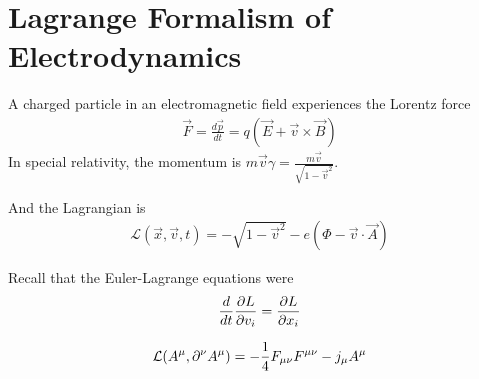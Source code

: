 \section{Lagrange Formalism of Electrodynamics}
A charged particle in an electromagnetic field experiences the Lorentz force
\begin{align*}
  \vec{F} = \frac{d \vec{p}}{d t} = q(\vec{E} + \vec{v} \times \vec{B})
\end{align*}
In special relativity, the momentum is $m \vec{v} \gamma = \frac{m \vec{v}}{\sqrt{1 - \vec{v}^{2}}}$.

And the Lagrangian is
\begin{align*}
  \mathcal{L}(\vec{x},\vec{v},t) = - \sqrt{1 - \vec{v}^{2}} - e(\Phi - \vec{v} \cdot \vec{A})
\end{align*}

Recall that the Euler-Lagrange equations were
\begin{align*}
  \frac{d }{d t} \frac{\partial L}{\partial v_i} = \frac{\partial L}{\partial x_i}
\end{align*}

\begin{align*}
  \mathcal{L}(A^{\mu}, \partial^{\nu}A^{\mu}) = - \frac{1}{4} F_{\mu \nu} F^{\mu \nu} - j_{\mu}A^{\mu}
\end{align*}

